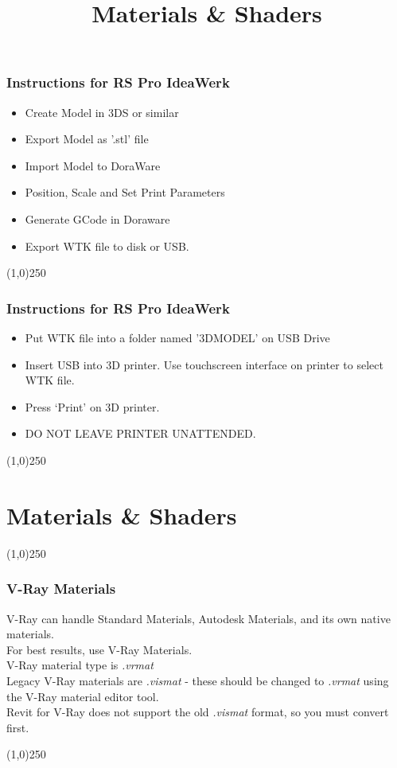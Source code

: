 \begin{frame}
\frametitle{Instructions for RS Pro IdeaWerk}
\begin{itemize}
	\item Create Model in 3DS or similar
	\item Export Model as '.stl' file
	\item Import Model to DoraWare
	\item Position, Scale and Set Print Parameters
	\item Generate GCode in Doraware
	\item Export WTK file to disk or USB.
\end{itemize}
\end{frame}
\begin{center}\line(1,0){250}\end{center}


\begin{frame}
\frametitle{Instructions for RS Pro IdeaWerk}
\begin{itemize}
	\item Put WTK file into a folder named '3DMODEL' on USB Drive
	\item Insert USB into 3D printer. Use touchscreen interface on printer to select WTK file.
	\item Press `Print' on 3D printer.
	\item DO NOT LEAVE PRINTER UNATTENDED.
\end{itemize}
\end{frame}
\begin{center}\line(1,0){250}\end{center}





\section{Materials \& Shaders}
\begin{frame}
\title[Materials \& Shaders]{Materials \& Shaders}
\titlepage
\end{frame}\begin{center}\line(1,0){250}\end{center}




\begin{frame}
	\frametitle{V-Ray Materials}
	V-Ray can handle Standard Materials, Autodesk Materials, and its own native materials.\\
	For best results, use V-Ray Materials.\\
	V-Ray material type is \textit{.vrmat}\\
	Legacy V-Ray materials are \textit{.vismat} - these should be changed to \textit{.vrmat} using the V-Ray material editor tool.\\
	Revit for V-Ray does not support the old \textit{.vismat} format, so you must convert first.
\end{frame}
\begin{center}\line(1,0){250}\end{center}


